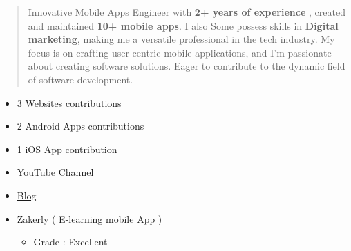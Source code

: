 \documentclass[10pt,a4paper,ragged2e,withhyper]{altacv}
\begin{document}
\begin{paracol}{2}
        \switchcolumn

        \begin{quote}

            Innovative Mobile Apps Engineer with \textbf{2+ years of experience} , created and maintained \textbf{10+ mobile apps}.
            I also Some possess skills in \textbf{Digital marketing}, making me a versatile professional in the tech industry.
            My focus is on crafting user-centric mobile applications, and I'm passionate about creating software solutions.
            Eager to contribute to the dynamic field of software development.
        \end{quote}


        \divider

        \begin{itemize}
            \item 3 Websites contributions
            \item 2 Android Apps contributions
            \item 1 iOS App contribution

        \end{itemize}
        \divider

        \begin{itemize}
            \item  \href{https://www.youtube.com/c/LightFeather42}{YouTube Channel}
            \item  \href{https://lightfeather42.blogspot.com/}{Blog}

        \end{itemize}
        \divider
        \divider


        \begin{itemize}
            \item Zakerly ( E-learning mobile App )
            \begin{itemize}
                \item Grade : Excellent
            \end{itemize}
        \end{itemize}



\end{paracol}
\end{document}

